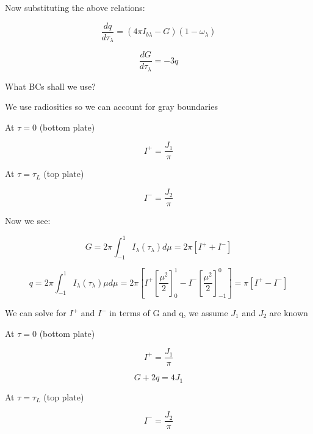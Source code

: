 \documentclass[12pt]{article}
\renewcommand{\_}{\kern-1.5pt\textunderscore\kern-1.5pt}
\begin{document}
\begin{itemize}
Now substituting the above relations:\par

 \[ \frac{dq}{d \tau_{ \lambda }}= \left( 4 \pi I_{b \lambda }-G \right)  \left( 1- \omega _{ \lambda } \right)  \] \par

 \[ \frac{dG}{d \tau_{ \lambda }}=-3q \] \par


\vspace{\baselineskip}
What BCs shall we use?\par

We use radiosities so we can account for gray boundaries\par

At  \(  \tau=0  \) (bottom plate)\par

 \[ I^{+}=\frac{J_{1}}{ \pi } \] \par

At  \(  \tau= \tau_{L} \)  (top plate)\par

 \[ I^{-}=\frac{J_{2}}{ \pi } \] \par

Now we see:\par

 \[ G=2 \pi  \int _{-1}^{1}I_{ \lambda } \left(  \tau_{ \lambda } \right) d \mu =2 \pi  \left[ I^{+}+I^{-} \right]  \] \par

 \[ q=2 \pi  \int _{-1}^{1}I_{ \lambda } \left(  \tau_{ \lambda } \right)  \mu  d \mu =2 \pi  \left[ I^{+} \left[ \frac{ \mu ^{2}}{2} \right] _{0}^{1}-I^{-} \left[ \frac{ \mu ^{2}}{2} \right] _{-1}^{0} \right] = \pi  \left[ I^{+}-I^{-} \right]  \] \par

We can solve for  \( I^{+} \)  and  \( I^{-} \)  in terms of G and q, we assume  \( J_{1} \)  and  \( J_{2} \)  are known\par

At  \(  \tau=0  \) (bottom plate)\par

 \[ I^{+}=\frac{J_{1}}{ \pi } \] \par

 \[ G+2q=4J_{1} \] \par

At  \(  \tau= \tau_{L} \)  (top plate)\par

 \[ I^{-}=\frac{J_{2}}{ \pi } \] \par


\end{itemize}
\end{document}
